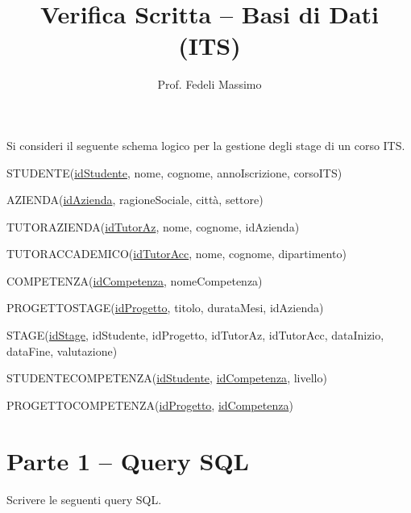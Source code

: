 \documentclass[a4paper,11pt]{article}
\title{Verifica Scritta – Basi di Dati (ITS)}
\author{Prof. Fedeli Massimo}
\date{}
\begin{document}
	
	\maketitle
	
	Si consideri il seguente schema logico per la gestione degli stage di un corso ITS.
	
	\bigskip
	
	STUDENTE(\underline{idStudente}, nome, cognome, annoIscrizione, corsoITS)
	
	AZIENDA(\underline{idAzienda}, ragioneSociale, città, settore)
	
	TUTORAZIENDA(\underline{idTutorAz}, nome, cognome, idAzienda)
	
	TUTORACCADEMICO(\underline{idTutorAcc}, nome, cognome, dipartimento)
	
	COMPETENZA(\underline{idCompetenza}, nomeCompetenza)
	
	PROGETTOSTAGE(\underline{idProgetto}, titolo, durataMesi, idAzienda)
	
	STAGE(\underline{idStage}, idStudente, idProgetto, idTutorAz, idTutorAcc, dataInizio, dataFine, valutazione)
	
	STUDENTECOMPETENZA(\underline{idStudente}, \underline{idCompetenza}, livello)
	
	PROGETTOCOMPETENZA(\underline{idProgetto}, \underline{idCompetenza})
	
	\bigskip
	
	\section*{Parte 1 – Query SQL}
	
	Scrivere le seguenti query SQL.
	
\end{document}
